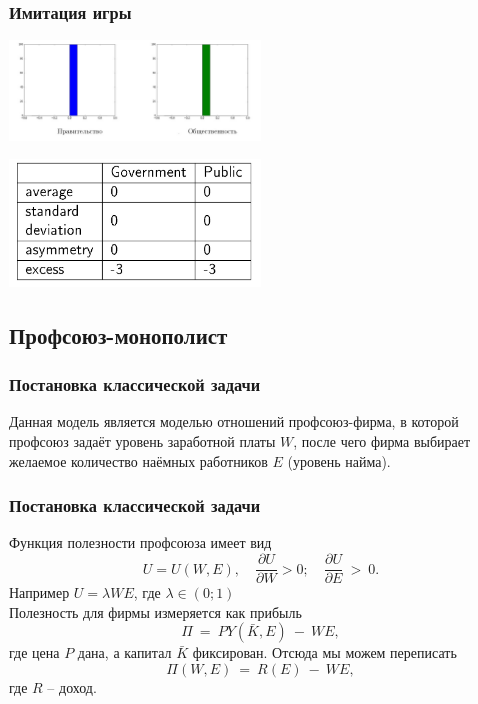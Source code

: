 \documentclass {beamer}
\begin{document}
\begin{frame}
	\frametitle{Имитация игры}
	\begin{center}
		\includegraphics[width=0.50\textwidth]{forth}
	\end{center}
	

	\begin{center}
		\includegraphics[width=0.50\textwidth]{fifth}
	\end{center}
	
\end{frame}



\begin{frame}
	\section{Профсоюз-монополист}
\frametitle{Постановка классической задачи}
Данная модель является моделью отношений профсоюз-фирма, в которой профсоюз задаёт уровень заработной платы $W$, после чего фирма выбирает желаемое количество наёмных работников  $E$ (уровень найма).


\end{frame}

\begin{frame}

\frametitle{Постановка классической задачи}
Функция полезности профсоюза имеет вид 
$$ U = U(W,E), \quad \frac{\partial U}{\partial W} > 0; \quad \frac{\partial U}{\partial E}~>~0.$$ 
Например $U = \lambda WE$, где $\lambda \in (0; 1)$\\
Полезность для фирмы измеряется как прибыль 
$$\Pi~=~PY(\bar K,E)~-~WE,$$ 
где цена $P$ дана, а капитал $\bar K$ фиксирован. Отсюда мы можем переписать 
$$\Pi(W,E)~=~R(E)~-~WE,$$ 
где $R$ -- доход.
\end{frame}
\end{document}
